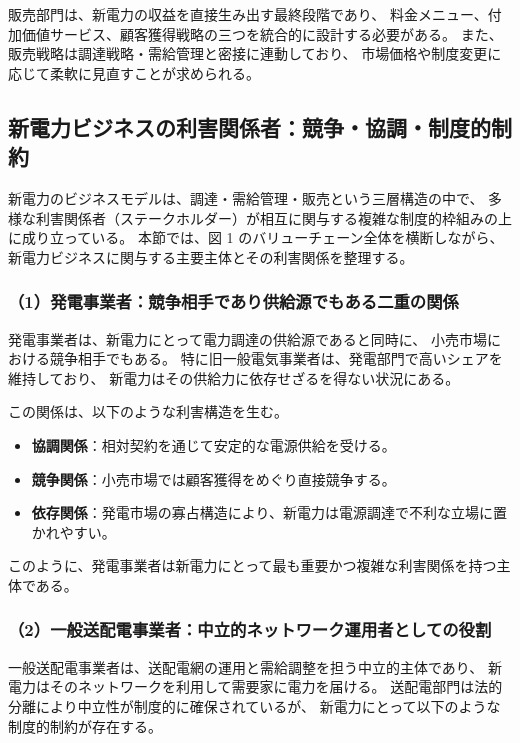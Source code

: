 販売部門は、新電力の収益を直接生み出す最終段階であり、
料金メニュー、付加価値サービス、顧客獲得戦略の三つを統合的に設計する必要がある。
また、販売戦略は調達戦略・需給管理と密接に連動しており、
市場価格や制度変更に応じて柔軟に見直すことが求められる。

\subsection{新電力ビジネスの利害関係者：競争・協調・制度的制約}

新電力のビジネスモデルは、調達・需給管理・販売という三層構造の中で、
多様な利害関係者（ステークホルダー）が相互に関与する複雑な制度的枠組みの上に成り立っている。
本節では、図 1 のバリューチェーン全体を横断しながら、
新電力ビジネスに関与する主要主体とその利害関係を整理する。

\subsubsection{（1）発電事業者：競争相手であり供給源でもある二重の関係}

発電事業者は、新電力にとって電力調達の供給源であると同時に、
小売市場における競争相手でもある。
特に旧一般電気事業者は、発電部門で高いシェアを維持しており、
新電力はその供給力に依存せざるを得ない状況にある。

この関係は、以下のような利害構造を生む。

\begin{itemize}
  \item \textbf{協調関係}：相対契約を通じて安定的な電源供給を受ける。
  \item \textbf{競争関係}：小売市場では顧客獲得をめぐり直接競争する。
  \item \textbf{依存関係}：発電市場の寡占構造により、新電力は電源調達で不利な立場に置かれやすい。
\end{itemize}

このように、発電事業者は新電力にとって最も重要かつ複雑な利害関係を持つ主体である。

\subsubsection{（2）一般送配電事業者：中立的ネットワーク運用者としての役割}

一般送配電事業者は、送配電網の運用と需給調整を担う中立的主体であり、
新電力はそのネットワークを利用して需要家に電力を届ける。
送配電部門は法的分離により中立性が制度的に確保されているが、
新電力にとって以下のような制度的制約が存在する。

